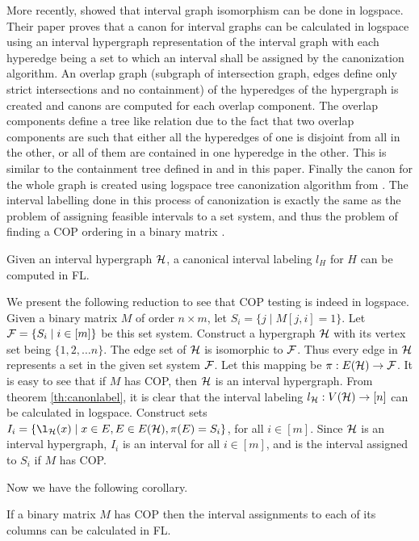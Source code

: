 \documentclass[MS]             %
              {iitmdiss_as}    %
\begin{document}
\noindent
More recently, \cite{kklv10} showed that interval graph isomorphism
can be done in logspace. Their paper proves that a canon for interval
graphs can be calculated in logspace using an interval hypergraph
representation of the interval graph with each hyperedge being a set
to which an interval shall be assigned by the canonization
algorithm. An overlap graph (subgraph of intersection graph, edges
define only strict intersections and no containment) of the hyperedges
of the hypergraph is created and canons are computed for each overlap
component. The overlap components define a tree like relation due to
the fact that two overlap components are such that either all the
hyperedges of one is disjoint from all in the other, or all of them
are contained in one hyperedge in the other. This is similar to the
containment tree defined in \cite{nsnrs09} and in this paper. Finally
the canon for the whole graph is created using logspace tree
canonization algorithm from \cite{sl92}. The interval labelling done
in this process of canonization is exactly the same as the problem of
assigning feasible intervals to a set system, and thus the problem of
finding a COP ordering in a binary matrix \cite{nsnrs09}.

\begin{theorem}
  \label{th:canonlabel}
  Given an interval hypergraph ${\cal H}$, a canonical interval labeling
  $l_H$ for $H$ can be computed in FL.
\end{theorem}


We present the following reduction to see that COP testing is indeed
in logspace. Given a binary matrix $M$ of order $n \times m$, let $S_i
= \{j \mid M[j,i]=1 \}$. Let ${\cal F} = \{S_i \mid i \in [m] \}$ be this
set system. Construct a hypergraph ${\cal H}$ with its vertex set being
$\{1, 2, \dots n\}$. The edge set of ${\cal H}$ is isomorphic to
${\cal F}$. Thus every edge in ${\cal H}$ represents a set in the given set
system ${\cal F}$. Let this mapping be $\pi: E({\cal H}) \rightarrow {\cal F}$. It is
easy to see that if $M$ has COP, then ${\cal H}$ is an interval
hypergraph. From theorem \ref{th:canonlabel}, it is clear that the
interval labeling $l_{{\cal H}}: V({\cal H}) \rightarrow [n]$ can be calculated
in logspace. Construct sets $I_i = \{ \l_{\cH}(x) \mid x \in E, E \in
E(\cH), \pi(E) = S_i\}$, for all $i \in [m]$. Since ${\cal H}$ is an
interval hypergraph, $I_i$ is an interval for all $i \in [m]$, and is
the interval assigned to $S_i$ if $M$ has COP.

Now we have the following corollary.
\begin{corollary}
  \label{cor:coplog}
  If a binary matrix $M$ has COP then the interval assignments to each
  of its columns can be calculated in FL.
\end{corollary}
\end{document}
